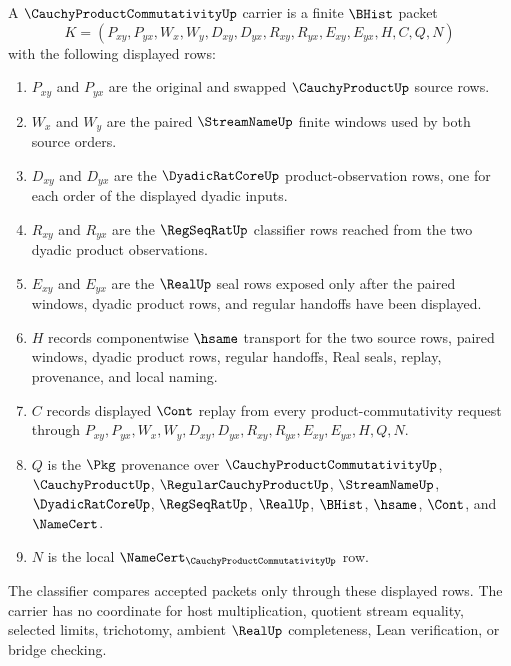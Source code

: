 \begin{definition}
\label{def:cauchy-product-commutativity-carrier}
A $\CauchyProductCommutativityUp$ carrier is a finite $\BHist$ packet
$$
K=(P_{xy},P_{yx},W_x,W_y,D_{xy},D_{yx},R_{xy},R_{yx},E_{xy},E_{yx},H,C,Q,N)
$$
with the following displayed rows:
\begin{enumerate}
\item $P_{xy}$ and $P_{yx}$ are the original and swapped $\CauchyProductUp$ source rows.
\item $W_x$ and $W_y$ are the paired $\StreamNameUp$ finite windows used by both source orders.
\item $D_{xy}$ and $D_{yx}$ are the $\DyadicRatCoreUp$ product-observation rows, one for each order of the displayed dyadic inputs.
\item $R_{xy}$ and $R_{yx}$ are the $\RegSeqRatUp$ classifier rows reached from the two dyadic product observations.
\item $E_{xy}$ and $E_{yx}$ are the $\RealUp$ seal rows exposed only after the paired windows, dyadic product rows, and regular handoffs have been displayed.
\item $H$ records componentwise $\hsame$ transport for the two source rows, paired windows, dyadic product rows, regular handoffs, Real seals, replay, provenance, and local naming.
\item $C$ records displayed $\Cont$ replay from every product-commutativity request through $P_{xy},P_{yx},W_x,W_y,D_{xy},D_{yx},R_{xy},R_{yx},E_{xy},E_{yx},H,Q,N$.
\item $Q$ is the $\Pkg$ provenance over $\CauchyProductCommutativityUp$, $\CauchyProductUp$, $\RegularCauchyProductUp$, $\StreamNameUp$, $\DyadicRatCoreUp$, $\RegSeqRatUp$, $\RealUp$, $\BHist$, $\hsame$, $\Cont$, and $\NameCert$.
\item $N$ is the local $\NameCert_{\CauchyProductCommutativityUp}$ row.
\end{enumerate}
The classifier compares accepted packets only through these displayed rows. The carrier has no coordinate for host multiplication, quotient stream equality, selected limits, trichotomy, ambient $\RealUp$ completeness, Lean verification, or bridge checking.
\end{definition}

